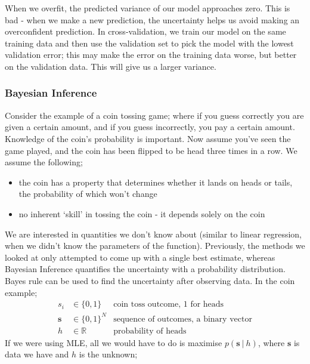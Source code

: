 \documentclass[a4paper, 12pt]{article}
\renewcommand{\vec}[1]{\boldsymbol{#1}}
\newcommand{\mbbr}[0]{\mathbb{R}}
\begin{document}
            When we overfit, the predicted variance of our model approaches zero.
            This is bad - when we make a new prediction, the uncertainty helps us avoid making an overconfident prediction.
            In cross-validation, we train our model on the same training data and then use the validation set to pick the model with the lowest validation error; this may make the error on the training data worse, but better on the validation data.
            This will give us a larger variance.
            \subsubsection*{Bayesian Inference}
                Consider the example of a coin tossing game; where if you guess correctly you are given a certain amount, and if you guess incorrectly, you pay a certain amount.
                Knowledge of the coin's probability is important.
                Now assume you've seen the game played, and the coin has been flipped to be head three times in a row.
                We assume the following;
                \begin{itemize}
                    \itemsep0em
                    \item the coin has a property that determines whether it lands on heads or tails, the probability of which won't change
                    \item no inherent `skill' in tossing the coin - it depends solely on the coin
                \end{itemize}
                We are interested in quantities we don't know about (similar to linear regression, when we didn't know the parameters of the function).
                Previously, the methods we looked at only attempted to come up with a single best estimate, whereas Bayesian Inference quantifies the uncertainty with a probability distribution.
                Bayes rule can be used to find the uncertainty after observing data.
                In the coin example;
                \begin{align*}
                    s_i & \in \{0, 1\} & \text{coin toss outcome, $1$ for heads} \\
                    \vec{s} & \in \{0, 1\}^N & \text{sequence of outcomes, a binary vector} \\
                    h & \in \mbbr & \text{probability of heads}
                \end{align*}
                If we were using MLE, all we would have to do is maximise $p(\vec{s}\ |\ h)$, where $\vec{s}$ is data we have and $h$ is the unknown;
\end{document}
